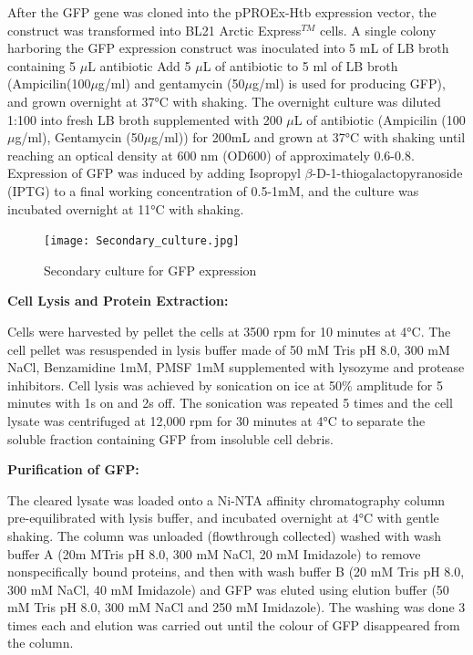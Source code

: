 \documentclass[twoside]{article}
\begin{document}
\begin{multicols}{2}
After the GFP gene was cloned into the pPROEx-Htb expression vector, the construct was transformed into 
BL21 Arctic Express$^{TM}$ cells. A single colony harboring the GFP expression construct was inoculated 
into 5 mL of LB broth containing 5 $\mu$L antibiotic Add 5 $\mu$L of antibiotic to 5 ml of LB broth
(Ampicilin(100$\mu$g/ml) and gentamycin (50$\mu$g/ml) is used for producing GFP), and grown overnight at 37°C with shaking. 
The overnight culture was diluted 1:100 into fresh LB broth supplemented with 200 $\mu$L of antibiotic (Ampicilin (100$\mu$g/ml), Gentamycin (50$\mu$g/ml)) 
for 200mL and grown at 37°C with shaking 
until reaching an optical density at 600 nm (OD600) of approximately 0.6-0.8. 
Expression of GFP was induced by adding Isopropyl $\beta$-D-1-thiogalactopyranoside (IPTG) 
to a final working concentration of 0.5-1mM, and the culture was incubated overnight at 11°C with shaking.

\begin{figure}[H]
    \centering
    \texttt{[image: Secondary\_culture.jpg]}
    \caption{Secondary culture for GFP expression}
    \label{fig:Secondary_culture}
\end{figure}

\textbf{Cell Lysis and Protein Extraction:}

Cells were harvested by pellet the cells at 3500 rpm for 10 minutes at 4°C. 
The cell pellet was resuspended in lysis buffer made of 50 mM Tris pH 8.0, 300 mM NaCl, 
Benzamidine 1mM, PMSF 1mM supplemented with lysozyme and protease inhibitors. 
Cell lysis was achieved by sonication on ice at 50\% amplitude for 5 minutes with 1s on and 2s off.
The sonication was repeated 5 times and the cell lysate was centrifuged at 12,000 rpm for 30 minutes at 4°C to separate the soluble fraction containing GFP from insoluble cell debris.




\textbf{Purification of GFP:}

The cleared lysate was loaded onto a Ni-NTA affinity chromatography column pre-equilibrated with lysis buffer, and incubated overnight at 4°C with gentle shaking. 
The column was unloaded (flowthrough collected) washed with wash buffer A (20m MTris pH 8.0, 300 mM NaCl, 20 mM Imidazole) to remove nonspecifically bound proteins, 
and then with wash buffer B (20 mM Tris pH 8.0, 300 mM NaCl, 40 mM Imidazole) and GFP was eluted using elution buffer (50 mM Tris pH 8.0, 300 mM NaCl and 250 mM Imidazole).
The washing was done 3 times each and elution was carried out until the colour of GFP disappeared from the column.


\end{multicols}
\end{document}

